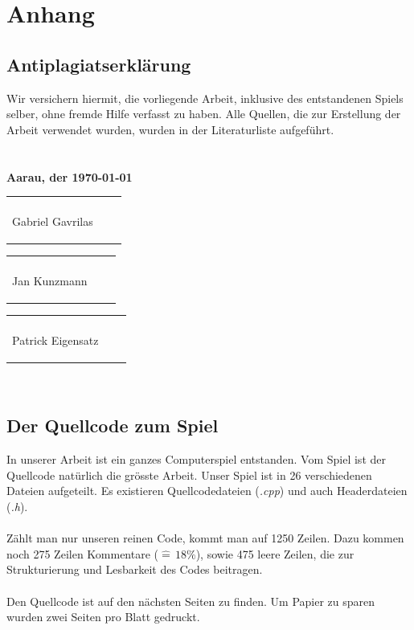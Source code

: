 \documentclass[11pt,a4paper]{scrbook}
\begin{document}
\clearpage
{}
\part{Anhang}
\listoffigures

\clearpage

\printbibliography

\clearpage

\chapter*{Antiplagiatserklärung}
Wir versichern hiermit, die vorliegende Arbeit, inklusive des entstandenen Spiels
selber, ohne fremde Hilfe verfasst zu haben. Alle Quellen, die zur Erstellung
der Arbeit verwendet wurden, wurden in der Literaturliste aufgeführt.
\\\\\\
\textbf{Aarau, der \today}\\

\vspace{1 cm} 
\begin{tabular}{p{5cm}p{.5cm}l}
\dotfill \\ 
\begin{center}
Gabriel Gavrilas

\end{center}\end{tabular}%
\hfill 
\begin{tabular}{p{5cm}p{.5cm}l}
\dotfill \\ 
\begin{center}
Jan Kunzmann

\end{center}\end{tabular}%
\hfill 
\begin{tabular}{p{5cm}p{.5cm}l}
\dotfill \\ 
\begin{center}
Patrick Eigensatz
\end{center}
\end{tabular}%
\\


\chapter*{Der Quellcode zum Spiel}
In unserer Arbeit ist ein ganzes Computerspiel entstanden. Vom Spiel ist der Quellcode natürlich die grösste Arbeit.
Unser Spiel ist in 26 verschiedenen Dateien aufgeteilt. Es existieren Quellcodedateien (\textit{.cpp}) und auch Headerdateien (\textit{.h}).\\
\\
Zählt man nur unseren reinen Code, kommt man auf 1250 Zeilen. Dazu kommen noch 275
Zeilen Kommentare ($\widehat{=}\,18\%$), sowie 475 leere Zeilen, die zur Strukturierung und Lesbarkeit des Codes beitragen.\\
\\
Den Quellcode ist auf den nächsten Seiten zu finden. Um Papier zu sparen wurden zwei Seiten pro Blatt
gedruckt.
\end{document}
